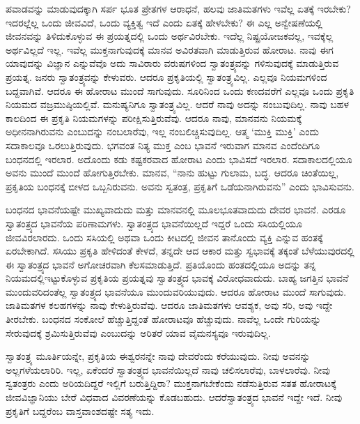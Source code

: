 ಪವಾಡವನ್ನು ಮಾಡುವುದಕ್ಕಾಗಿ ಸರ್ಪ ಭೂತ ಪ್ರೇತಗಳ ಆರಾಧನೆ, ಹಲವು ಜಾತಿಮತಗಳು ಇವೆಲ್ಲ ಏತಕ್ಕೆ ಇರಬೇಕು? ಇದರಲ್ಲೆಲ್ಲ ಒಂದು ಜೀವವಿದೆ, ಒಂದು ವ್ಯಕ್ತಿತ್ವ ಇದೆ ಎಂದು ಏತಕ್ಕೆ ಹೇಳಬೇಕು? ಈ ಎಲ್ಲ ಅನ್ವೇಷಣೆಯಲ್ಲಿ ಜೀವನವನ್ನು ತಿಳಿದುಕೊಳ್ಳುವ ಈ ಪ್ರಯತ್ನದಲ್ಲಿ ಒಂದು ಅರ್ಥವಿರಬೇಕು. ಇದೆಲ್ಲ ನಿಷ್ಪ್ರಯೋಜಕವಲ್ಲ, ಇವಕ್ಕೆಲ್ಲ ಅರ್ಥವಿಲ್ಲದೆ ಇಲ್ಲ. ಇವೆಲ್ಲ ಮುಕ್ತನಾಗುವುದಕ್ಕೆ ಮಾನವ ಅವಿರತವಾಗಿ ಮಾಡುತ್ತಿರುವ ಹೋರಾಟ. ನಾವು ಈಗ ಯಾವುದನ್ನು ವಿಜ್ಞಾನ ಎನ್ನುವೆವೊ ಅದು ಸಾವಿರಾರು ವರುಷಗಳಿಂದ ಸ್ವಾತಂತ್ರ್ಯವನ್ನು ಗಳಿಸುವುದಕ್ಕೆ ಮಾಡುತ್ತಿರುವ ಪ್ರಯತ್ನ. ಜನರು ಸ್ವಾತಂತ್ರ್ಯವನ್ನು ಕೇಳುವರು. ಆದರೂ ಪ್ರಕೃತಿಯಲ್ಲಿ ಸ್ವಾತಂತ್ರ್ಯವಿಲ್ಲ. ಎಲ್ಲವೂ ನಿಯಮಗಳಿಂದ ಬದ್ದವಾಗಿವೆ. ಆದರೂ ಈ ಹೋರಾಟ ಮುಂದೆ ಸಾಗುವುದು. ಸೂರಿನಿಂದ ಒಂದು ಕಣದವರೆಗೆ ಎಲ್ಲವೂ ಒಂದು ಪ್ರಕೃತಿ ನಿಯಮದ ವಜ್ರಮುಷ್ಠಿಯಲ್ಲಿವೆ. ಮನುಷ್ಯನಿಗೂ ಸ್ವಾತಂತ್ರ್ಯವಿಲ್ಲ. ಆದರೆ ನಾವು ಅದನ್ನು ನಂಬುವುದಿಲ್ಲ. ನಾವು ಬಹಳ ಕಾಲದಿಂದ ಈ ಪ್ರಕೃತಿ ನಿಯಮಗಳನ್ನು ಪರೀಕ್ಷಿಸುತ್ತಿರುವೆವು. ಆದರೂ ನಾವು, ಮಾನವನು ನಿಯಮಕ್ಕೆ ಅಧೀನನಾಗಿರುವನು ಎಂಬುದನ್ನು ನಂಬಲಾರೆವು, ಇಲ್ಲ ನಂಬಲಿಚ್ಚಿಸುವುದಿಲ್ಲ. ಆತ್ಮ `ಮುಕ್ತಿ ಮುಕ್ತಿ' ಎಂದು ಸದಾಕಾಲವೂ ಒರಲುತ್ತಿರುವುದು. ಭಗವಂತ ನಿತ್ಯ ಮುಕ್ತ ಎಂಬ ಭಾವನೆ ಇರುವಾಗ ಮಾನವ ಎಂದೆಂದಿಗೂ ಬಂಧನದಲ್ಲಿ ಇರಲಾರ. ಅದೊಂದು ಕಡು ಕಷ್ಟಕರವಾದ ಹೋರಾಟ ಎಂದು ಭಾವಿಸದೆ ಇರಲಾರ. ಸದಾಕಾಲದಲ್ಲಿಯೂ ಅವನು ಮುಂದೆ ಮುಂದೆ ಹೋಗುತ್ತಿರಬೇಕು. ಮಾನವ, “ನಾನು ಹುಟ್ಟು ಗುಲಾಮ, ಬದ್ಧ. ಆದರೂ ಚಿಂತೆಯಿಲ್ಲ, ಪ್ರಕೃತಿಯ ಬಂಧನಕ್ಕೆ ಬೀಳದ ಒಬ್ಬನಿರುವನು. ಅವನು ಸ್ವತಂತ್ರ, ಪ್ರಕೃತಿಗೆ ಒಡೆಯನಾಗಿರುವನು'' ಎಂದು ಭಾವಿಸುವನು.

ಬಂಧನದ ಭಾವನೆಯಷ್ಟೇ ಮುಖ್ಯವಾದುದು ಮತ್ತು ಮಾನವನಲ್ಲಿ ಮೂಲಭೂತವಾದುದು ದೇವರ ಭಾವನೆ. ಎರಡೂ ಸ್ವಾತಂತ್ರ್ಯದ ಭಾವನೆಯ ಪರಿಣಾಮಗಳು. ಸ್ವಾತಂತ್ರ್ಯದ ಭಾವನೆಯಿಲ್ಲದೆ ಇದ್ದರೆ ಒಂದು ಸಸಿಯಲ್ಲಿಯೂ ಜೀವವಿರಲಾರದು. ಒಂದು ಸಸಿಯಲ್ಲಿ ಅಥವಾ ಒಂದು ಕೀಟದಲ್ಲಿ ಜೀವನ ತಾನೊಂದು ವ್ಯಕ್ತಿ ಎನ್ನುವ ಹಂತಕ್ಕೆ ಏರಬೇಕಾಗಿದೆ. ಸಸಿಯು ಪ್ರಕೃತಿ ಹೇಳಿದಂತೆ ಕೇಳದೆ, ತನ್ನದೇ ಆದ ಆಕಾರ ಮತ್ತು ಸ್ವಭಾವಕ್ಕೆ ತಕ್ಕಂತೆ ಬೆಳೆಯುವುರದಲ್ಲಿ ಈ ಸ್ವಾತಂತ್ರ್ಯದ ಭಾವನೆ ಅಗೋಚರವಾಗಿ ಕೆಲಸಮಾಡುತ್ತಿದೆ. ಪ್ರತಿಯೊಂದು ಹಂತದಲ್ಲಿಯೂ ಅದನ್ನು ತನ್ನ ನಿಯಮದಲ್ಲಿ\break ಇಟ್ಟುಕೊಳ್ಳುವ ಪ್ರಕೃತಿಯ ಪ್ರಯತ್ನವು ಸ್ವಾತಂತ್ರ್ಯದ ಭಾವಕ್ಕೆ ವಿರೋಧವಾದುದು. ಬಾಹ್ಯ ಜಗತ್ತಿನ ಭಾವನೆ ಮುಂದುವರಿದಂತೆಲ್ಲ ಸ್ವಾತಂತ್ರ್ಯದ ಭಾವನೆಯೂ ಮುಂದುವರಿಯುವುದು. ಆದರೂ ಹೋರಾಟ ಮುಂದೆ ಸಾಗುವುದು. ಜಾತಿಮತಗಳ ಕಲಹಗಳನ್ನು ನಾವು ಕೇಳುತ್ತಿರುವೆವು. ಆದರೂ ಜಾತಿಮತಗಳು ಆವಶ್ಯಕ, ಅವು ಸರಿ, ಅವು ಇದ್ದೇ ತೀರಬೇಕು. ಬಂಧನದ ಸಂಕೋಲೆ ಹೆಚ್ಚುತ್ತಿದ್ದಂತೆ ಹೋರಾಟವೂ ಹೆಚ್ಚುವುದು. ನಾವೆಲ್ಲ ಒಂದೇ ಗುರಿಯನ್ನು ಸೇರುವುದಕ್ಕೆ ಶ್ರಮಿಸುತ್ತಿರುವೆವು ಎಂಬುದನ್ನು ಅರಿತರೆ ಯಾವ ವೈಮನಸ್ಯವೂ ಇರುವುದಿಲ್ಲ.

ಸ್ವಾತಂತ್ರ್ಯ ಮೂರ್ತಿಯನ್ನೇ, ಪ್ರಕೃತಿಯ ಈಶ್ವರನನ್ನೇ ನಾವು ದೇವರೆಂದು ಕರೆಯುವುದು. ನೀವು ಅವನನ್ನು ಅಲ್ಲಗಳೆಯಲಾರಿರಿ. ಇಲ್ಲ, ಏಕೆಂದರೆ ಸ್ವಾತಂತ್ರ್ಯದ ಭಾವನೆಯಿಲ್ಲದೆ ನಾವು ಚಲಿಸಲಾರೆವು, ಬಾಳಲಾರೆವು. ನೀವು ಸ್ವತಂತ್ರರು ಎಂದು ಅರಿಯದಿದ್ದರೆ ಇಲ್ಲಿಗೆ ಬರುತ್ತಿದ್ದಿರಾ? ಮುಕ್ತನಾಗಬೇಕೆಂದು ನಡೆಸುತ್ತಿರುವ ಸತತ ಹೋರಾಟಕ್ಕೆ ಜೀವವಿಜ್ಞಾನಿಯು ಬೇರೆ ವಿಧವಾದ ವಿವರಣೆಯನ್ನು ಕೊಡಬಹುದು. ಆದರೆ\break ಸ್ವಾತಂತ್ರ್ಯದ ಭಾವನೆ ಇದ್ದೇ ಇದೆ. ನೀವು ಪ್ರಕೃತಿಗೆ ಬದ್ದರೆಂಬ ವಾಸ್ತವಾಂಶದಷ್ಟೇ ಸತ್ಯ ಇದು.

